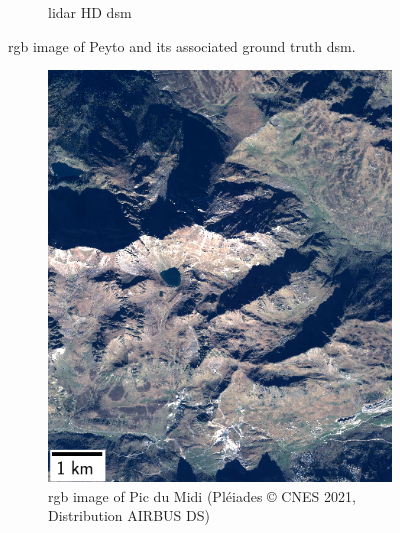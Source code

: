 \begin{figure}
\begin{subfigure}[t]{0.48\linewidth}
        \caption{\acrshort{lidar} HD \acrshort{dsm}}
        \label{fig:miniature_Peyto_gt}
    \end{subfigure}
    \caption{\acrshort{rgb} image of Peyto and its associated ground truth \acrshort{dsm}.}
    \label{fig:miniature_Peyto}
\end{figure}

\begin{figure}
    \centering
    \begin{subfigure}[t]{0.48\linewidth}
        \flushleft
        \includegraphics[width=\linewidth]{Images/Chap_6/miniature_Pic_du_midi.png}
        \caption{\acrshort{rgb} image of Pic du Midi (Pléiades © CNES 2021, Distribution AIRBUS DS)}
        \label{fig:miniature_pic_du_midi_rgb}
    \end{subfigure}\hfill
    \begin{subfigure}[t]{0.48\linewidth}
        \flushright

\end{subfigure}
\end{figure}
